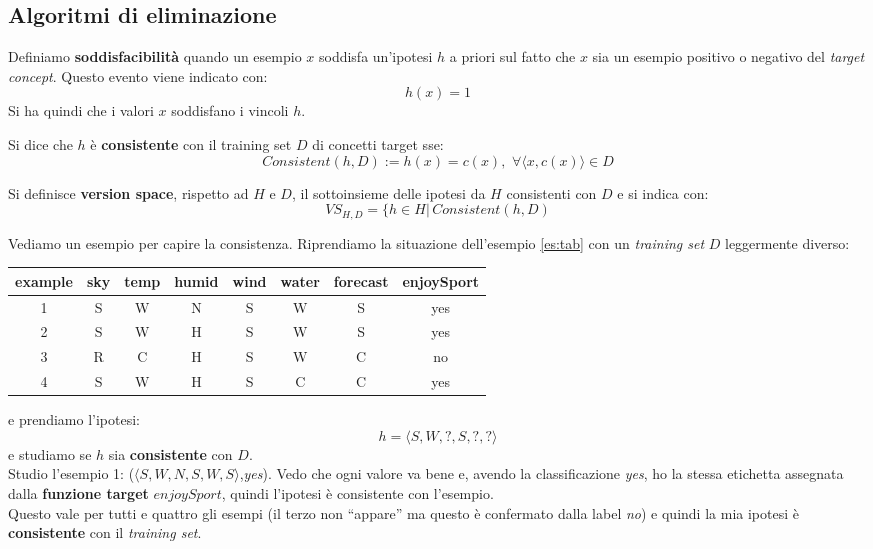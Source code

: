 \subsection{Algoritmi di eliminazione}
\begin{definizione}
  Definiamo \textbf{soddisfacibilità} quando un esempio $x$ soddisfa un'ipotesi
  $h$ a priori sul fatto che $x$ sia un esempio positivo o negativo del
  \textit{target concept}. Questo evento viene indicato con:
  \[h(x)=1\]
  Si ha quindi che i valori $x$ soddisfano i vincoli $h$. 
\end{definizione}
\begin{definizione}
  Si dice che $h$ è \textbf{consistente} con il training set $D$ di concetti
  target sse: 
  \[Consistent(h, D):=h(x)=c(x),\,\,\forall \langle x, c(x)\rangle\in D\]
\end{definizione}
\begin{definizione}
  Si definisce \textbf{version space}, rispetto ad $H$ e $D$, il
  sottoinsieme delle ipotesi da $H$ consistenti con $D$ e si indica con:
  \[VS_{H, D}=\{h\in H|\, Consistent(h, D)\]
\end{definizione}
\begin{esempio}
  Vediamo un esempio per capire la consistenza. Riprendiamo la situazione
  dell'esempio \ref{es:tab} con un \textit{training set} $D$ leggermente
  diverso: 
  \begin{table}[H]
    \centering
    \begin{tabular}[H]{|c|c|c|c|c|c|c|c|}
      \hline
      \textbf{example} & \textbf{sky} & \textbf{temp} & \textbf{humid}
      & \textbf{wind} & \textbf{water} & \textbf{forecast} &
      \textbf{enjoySport}\\
      \hline
      1 & S & W & N & S & W & S & \color{darkgreen} yes\\
      2 & S & W & H & S & W & S & \color{darkgreen} yes\\
      3 & R & C & H & S & W & C & \color{red} no\\
      4 & S & W & H & S & C & C & \color{darkgreen} yes\\
      \hline
    \end{tabular}
  \end{table}
  e prendiamo l'ipotesi:
  \[h=\langle S, W, ?, S, ?, ?\rangle\]
  e studiamo se $h$ sia \textbf{consistente} con $D$.\\
  Studio l'esempio 1: ($\langle S, W, N, S, W, S\rangle$,\textit{yes}). Vedo che
  ogni valore va bene e, avendo la classificazione 
  \textit{yes}, ho la stessa etichetta assegnata dalla \textbf{funzione target}
  $enjoySport$, quindi l'ipotesi è consistente con l'esempio. \\
  Questo vale per tutti e quattro gli esempi (il terzo non ``appare'' ma questo
  è confermato dalla label \textit{no}) e quindi la mia ipotesi è
  \textbf{consistente} con il \textit{training set}.
\end{esempio}

